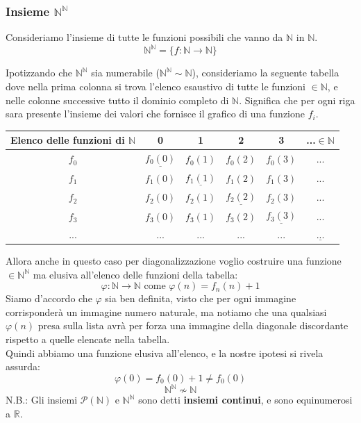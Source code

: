 \documentclass{article}
\begin{document}
\subsubsection{Insieme $\mathbb{N}^{\mathbb{N}}$}
Consideriamo l'insieme di tutte le funzioni possibili che vanno da $\mathbb{N}$ in $\mathbb{N}$.
$$\mathbb{N}^{\mathbb{N}}=\{f:\mathbb{N}\rightarrow\mathbb{N}\}$$

Ipotizzando che $\mathbb{N}^{\mathbb{N}}$ sia numerabile ($\mathbb{N}^{\mathbb{N}}\sim\mathbb{N}$),
consideriamo la seguente tabella dove nella prima
colonna si trova l'elenco esaustivo di tutte le funzioni $\in\mathbb{N}$, e nelle colonne successive tutto
il dominio completo di $\mathbb{N}$. Significa che per ogni riga sara presente l'insieme dei valori che
fornisce il grafico di una funzione $f_i$.
\begin{center}
    \begin{tabular}{c|ccccc}
        \toprule
        Elenco delle funzioni di $\mathbb{N}$ & \textbf{0}           & \textbf{1}           & \textbf{2}           & \textbf{3}            & \textbf{...$\in\mathbb{N}$} \\
        \midrule
        $f_0$                                 & $\underline{f_0(0)}$ & $f_0(1)$             & $f_0(2)$             & $f_0(3)$              & $...$                       \\
        $f_1$                                 & $f_1(0)$             & $\underline{f_1(1)}$ & $f_1(2)$             & $f_1(3)$              & $...$                       \\
        $f_2$                                 & $f_2(0)$             & $f_2(1)$             & $\underline{f_2(2)}$ & $f_2(3)$              & $...$                       \\
        $f_3$                                 & $f_3(0)$             & $f_3(1)$             & $f_3(2)$             & $\underline{f_ 3(3)}$ & $...$                       \\
        $...$                                 & $...$                & $...$                & $...$                & $...$                 & $\underline{...}$           \\
        \bottomrule
    \end{tabular}
\end{center}
Allora anche in questo caso per diagonalizzazione voglio costruire una funzione $\in\mathbb{N}^{\mathbb{N}}$ ma
elusiva all'elenco delle funzioni della tabella:
$$\varphi:\mathbb{N}\rightarrow\mathbb{N}\text{ come }\varphi(n)=f_n(n)+1$$
Siamo d'accordo che $\varphi$ sia ben definita, visto che per ogni immagine corrisponderà un immagine numero naturale,
ma notiamo che una qualsiasi $\varphi(n)$ presa sulla lista avrà per forza una immagine della diagonale discordante
rispetto a quelle elencate nella tabella.\\ Quindi abbiamo una funzione elusiva all'elenco, e la nostre ipotesi si rivela assurda:
$$\varphi(0)=f_0(0)+1\neq f_0(0)$$
$$\mathbb{N}^{\mathbb{N}}\nsim\mathbb{N}$$
N.B.: Gli insiemi $\mathcal{P}(\mathbb{N})$ e $\mathbb{N}^{\mathbb{N}}$ sono detti \textbf{insiemi continui},
e sono equinumerosi a $\mathbb{R}$.
\end{document}
